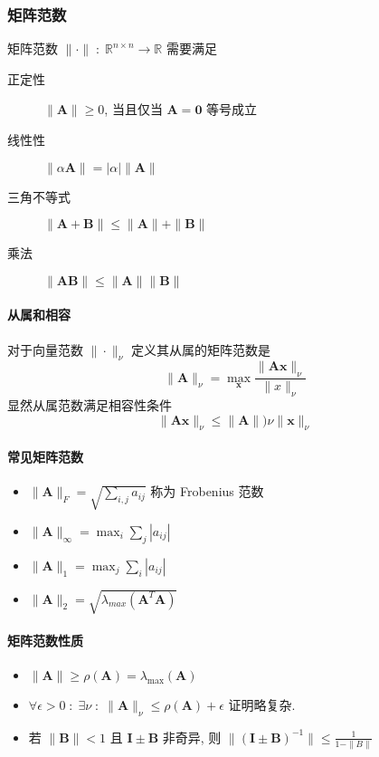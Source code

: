 \documentclass{ctexart}
\newcommand{\Rset}{\mathbb{R}}
\begin{document}
\subsubsection{矩阵范数}
    矩阵范数 $\|\cdot\|\;:\;\Rset^{n \times n}\to \Rset$ 需要满足
    \begin{description}
        \item[正定性] $\| \mathbf{A} \| \ge 0$, 当且仅当 $\mathbf{A} = \mathbf{0}$ 等号成立
        \item[线性性] $\|\alpha \mathbf{A}\| = |\alpha| \|\mathbf{A}\|$
        \item [三角不等式] $\|\mathbf{A} + \mathbf{B}\| \le \|\mathbf{A}\| + \|\mathbf{B}\|$
        \item[乘法] $\|\mathbf{A} \mathbf{B} \| \le \|\mathbf{A} \| \|\mathbf{B}\|$
    \end{description}
\paragraph{从属和相容}
    对于向量范数 $\|\cdot\|_{\nu}$ 定义其从属的矩阵范数是 \[
        \|\mathbf{A}\|_{\nu} = \max_{\mathbf{x}} \frac{\|\mathbf{A} \mathbf{x} \|_{\nu}}{\|x\|_{\nu}}
        \]
    显然从属范数满足相容性条件 \[
        \| \mathbf{A} \mathbf{x} \|_{\nu} \le \|\mathbf{A}\|){\nu} \|\mathbf{x}\|_{\nu}\]
\paragraph{常见矩阵范数}
    \begin{itemize}
        \item $\|\mathbf{A}\|_F = \sqrt{\sum_{i,j} a_{ij}}$ 称为 Frobenius 范数
        \item $\|\mathbf{A}\|_{\infty} = \max_i \sum_j |a_{ij}|$
        \item $\|\mathbf{A}\|_1 = \max_j \sum_i |a_{ij}|$
        \item $\|\mathbf{A}\|_2 = \sqrt{\lambda_{max}(\mathbf{A}^T \mathbf{A})}$
    \end{itemize}
\paragraph{矩阵范数性质}
    \begin{itemize}
        \item $\|\mathbf{A} \| \ge \rho(\mathbf{A} ) = \lambda_{\max}(\mathbf{A} )$
        \item $\forall \epsilon > 0\;:\;\exists \nu\;:\;\|\mathbf{A}\|_{\nu} \le \rho(\mathbf{A}) + \epsilon$
            证明略复杂.
        \item 若 $\|\mathbf{B} \| < 1$ 且 $\mathbf{I} \pm \mathbf{B} $ 非奇异, 则
            $ \| (\mathbf{I} \pm \mathbf{B})^{-1} \| \le \frac{1}{1 - \|B\|}$
    \end{itemize}
\end{document}
